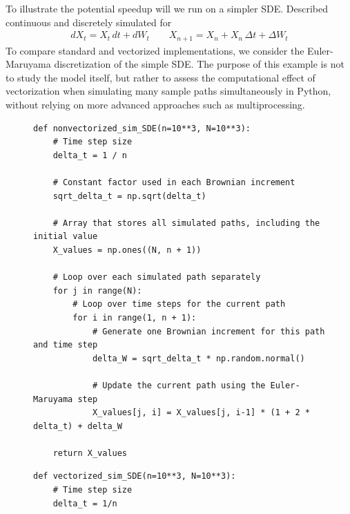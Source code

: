 \documentclass[11pt]{article}
\newcommand{\1}{\mathbbm{1}}
\theoremstyle{plain}
\theoremstyle{definition}
\theoremstyle{remark}
\begin{document}
To illustrate the potential speedup will we run on a simpler SDE. Described continuous and discretely simulated for
\begin{align}
dX_t=X_t\,dt+dW_t
\qquad X_{n+1}=X_n+X_n\,\Delta t+\Delta W_t 
\label{eq:basic_vector}
\end{align}
To compare standard and vectorized implementations, we consider the Euler-Maruyama discretization of the simple SDE. The purpose of this example is not to study the model itself, but rather to assess the computational effect of vectorization when simulating many sample paths simultaneously in Python, without relying on more advanced approaches such as multiprocessing.





\FloatBarrier

\begin{figure}[t]
\centering

\begin{minipage}[t]{0.48\textwidth}
\captionsetup{type=lstlisting}
\begin{lstlisting}
def nonvectorized_sim_SDE(n=10**3, N=10**3):
    # Time step size
    delta_t = 1 / n
    
    # Constant factor used in each Brownian increment
    sqrt_delta_t = np.sqrt(delta_t)
    
    # Array that stores all simulated paths, including the initial value
    X_values = np.ones((N, n + 1))

    # Loop over each simulated path separately
    for j in range(N):
        # Loop over time steps for the current path
        for i in range(1, n + 1):
            # Generate one Brownian increment for this path and time step
            delta_W = sqrt_delta_t * np.random.normal()
            
            # Update the current path using the Euler-Maruyama step
            X_values[j, i] = X_values[j, i-1] * (1 + 2 * delta_t) + delta_W

    return X_values
\end{lstlisting}
\end{minipage}
\hfill
\begin{minipage}[t]{0.48\textwidth}
\captionsetup{type=lstlisting}
\begin{lstlisting}
def vectorized_sim_SDE(n=10**3, N=10**3):
    # Time step size
    delta_t = 1/n
    

\end{lstlisting}
\end{minipage}
\end{figure}
\end{document}
